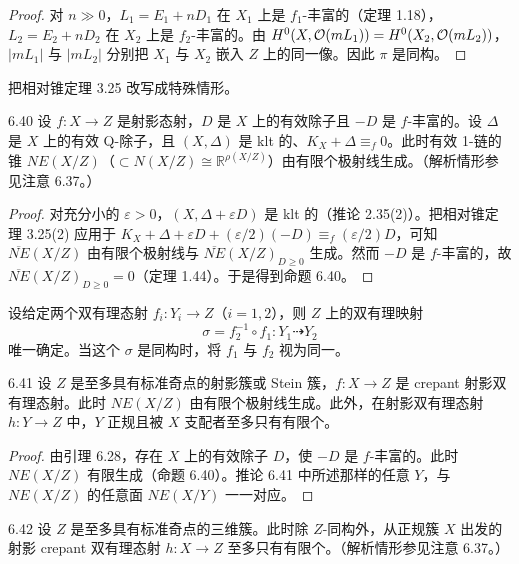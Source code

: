 \begin{proof}
对 $n\gg0$，$L_1=E_1+nD_1$ 在 $X_1$ 上是 $f_1$-丰富的（定理 1.18），$L_2=E_2+nD_2$ 在 $X_2$ 上是 $f_2$-丰富的。由 $H^0(X,\mathcal{O}(mL_1))=H^0(X_2,\mathcal{O}(mL_2))$，$|mL_1|$ 与 $|mL_2|$ 分别把 $X_1$ 与 $X_2$ 嵌入 $Z$ 上的同一像。因此 $\pi$ 是同构。
\end{proof}

把相对锥定理 3.25 改写成特殊情形。

\begin{propositionp}{6.40}
设 $f:X\to Z$ 是射影态射，$D$ 是 $X$ 上的有效除子且 $-D$ 是 $f$-丰富的。设 $\Delta$ 是 $X$ 上的有效 Q-除子，且 $(X,\Delta)$ 是 klt 的、$K_X+\Delta\equiv_f0$。此时有效 1-链的锥 $NE(X/Z)$（$\subset N(X/Z)\cong\mathbb{R}^{\rho(X/Z)}$）由有限个极射线生成。（解析情形参见注意 6.37。）
\end{propositionp}

\begin{proof}
对充分小的 $\varepsilon>0$，$(X,\Delta+\varepsilon D)$ 是 klt 的（推论 2.35(2)）。把相对锥定理 3.25(2) 应用于 $K_X+\Delta+\varepsilon D+(\varepsilon/2)(-D)\equiv_f(\varepsilon/2)D$，可知 $\overline{NE}(X/Z)$ 由有限个极射线与 $\overline{NE}(X/Z)_{D\ge0}$ 生成。然而 $-D$ 是 $f$-丰富的，故 $\overline{NE}(X/Z)_{D\ge0}=0$（定理 1.44）。于是得到命题 6.40。
\end{proof}

设给定两个双有理态射 $f_i:Y_i\to Z$（$i=1,2$），则 $Z$ 上的双有理映射
\[
\sigma=f_2^{-1}\circ f_1:Y_1\dashrightarrow Y_2
\]
唯一确定。当这个 $\sigma$ 是同构时，将 $f_1$ 与 $f_2$ 视为同一。

\begin{corollaryp}{6.41}
设 $Z$ 是至多具有标准奇点的射影簇或 Stein 簇，$f:X\to Z$ 是 crepant 射影双有理态射。此时 $NE(X/Z)$ 由有限个极射线生成。此外，在射影双有理态射 $h:Y\to Z$ 中，$Y$ 正规且被 $X$ 支配者至多只有有限个。
\end{corollaryp}

\begin{proof}
由引理 6.28，存在 $X$ 上的有效除子 $D$，使 $-D$ 是 $f$-丰富的。此时 $NE(X/Z)$ 有限生成（命题 6.40）。推论 6.41 中所述那样的任意 $Y$，与 $NE(X/Z)$ 的任意面 $NE(X/Y)$ 一一对应。
\end{proof}

\begin{theoremp}[{[KM87]}]{6.42}
设 $Z$ 是至多具有标准奇点的三维簇。此时除 $Z$-同构外，从正规簇 $X$ 出发的射影 crepant 双有理态射 $h:X\to Z$ 至多只有有限个。（解析情形参见注意 6.37。）
\end{theoremp}

